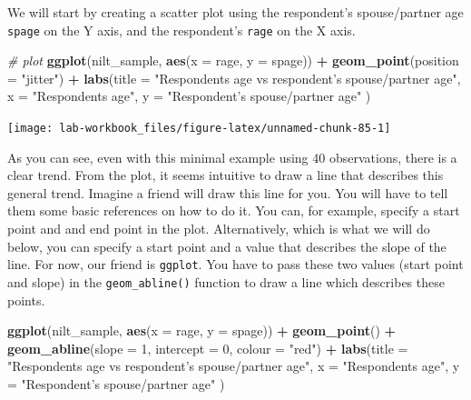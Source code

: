 \documentclass[
]{book}
\newenvironment{Shaded}{\begin{snugshade}}{\end{snugshade}}
\newcommand{\AttributeTok}[1]{\textcolor[rgb]{0.13,0.29,0.53}{#1}}
\newcommand{\CommentTok}[1]{\textcolor[rgb]{0.56,0.35,0.01}{\textit{#1}}}
\newcommand{\DecValTok}[1]{\textcolor[rgb]{0.00,0.00,0.81}{#1}}
\newcommand{\FunctionTok}[1]{\textcolor[rgb]{0.13,0.29,0.53}{\textbf{#1}}}
\newcommand{\NormalTok}[1]{#1}
\newcommand{\SpecialCharTok}[1]{\textcolor[rgb]{0.81,0.36,0.00}{\textbf{#1}}}
\newcommand{\StringTok}[1]{\textcolor[rgb]{0.31,0.60,0.02}{#1}}
\begin{document}
We will start by creating a scatter plot using the respondent's spouse/partner age \texttt{spage} on the Y axis, and the respondent's \texttt{rage} on the X axis.

\begin{Shaded}
\begin{Highlighting}[]
\CommentTok{\# plot}
\FunctionTok{ggplot}\NormalTok{(nilt\_sample,  }\FunctionTok{aes}\NormalTok{(}\AttributeTok{x =}\NormalTok{ rage, }\AttributeTok{y =}\NormalTok{ spage)) }\SpecialCharTok{+} 
  \FunctionTok{geom\_point}\NormalTok{(}\AttributeTok{position =} \StringTok{"jitter"}\NormalTok{) }\SpecialCharTok{+}
  \FunctionTok{labs}\NormalTok{(}\AttributeTok{title =} \StringTok{"Respondent\textquotesingle{}s age vs respondent’s spouse/partner age"}\NormalTok{, }
       \AttributeTok{x =} \StringTok{"Respondent\textquotesingle{}s age"}\NormalTok{, }\AttributeTok{y =} \StringTok{"Respondent’s spouse/partner age"}\NormalTok{ )}
\end{Highlighting}
\end{Shaded}

\begin{flushleft}\texttt{[image: lab-workbook\_files/figure-latex/unnamed-chunk-85-1]} \end{flushleft}

As you can see, even with this minimal example using 40 observations, there is a clear trend. From the plot, it seems intuitive to draw a line that describes this general trend. Imagine a friend will draw this line for you. You will have to tell them some basic references on how to do it. You can, for example, specify a start point and and end point in the plot. Alternatively, which is what we will do below, you can specify a start point and a value that describes the slope of the line. For now, our friend is \texttt{ggplot}. You have to pass these two values (start point and slope) in the \texttt{geom\_abline()} function to draw a line which describes these points.

\begin{Shaded}
\begin{Highlighting}[]
\FunctionTok{ggplot}\NormalTok{(nilt\_sample, }\FunctionTok{aes}\NormalTok{(}\AttributeTok{x =}\NormalTok{ rage, }\AttributeTok{y =}\NormalTok{ spage)) }\SpecialCharTok{+} 
  \FunctionTok{geom\_point}\NormalTok{() }\SpecialCharTok{+}
  \FunctionTok{geom\_abline}\NormalTok{(}\AttributeTok{slope =} \DecValTok{1}\NormalTok{, }\AttributeTok{intercept =} \DecValTok{0}\NormalTok{, }\AttributeTok{colour =} \StringTok{"red"}\NormalTok{) }\SpecialCharTok{+}
  \FunctionTok{labs}\NormalTok{(}\AttributeTok{title =} \StringTok{"Respondent\textquotesingle{}s age vs respondent’s spouse/partner age"}\NormalTok{, }
       \AttributeTok{x =} \StringTok{"Respondent\textquotesingle{}s age"}\NormalTok{, }\AttributeTok{y =} \StringTok{"Respondent’s spouse/partner age"}\NormalTok{ )}
\end{Highlighting}
\end{Shaded}
\end{document}
